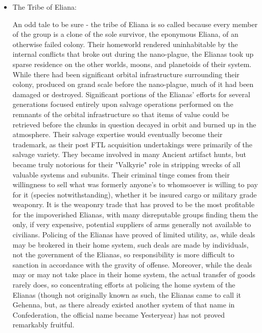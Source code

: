 \begin{itemize}
\item The Tribe of Eliana: 

An odd tale to be sure - the tribe of Eliana is so called because
every member of the group is a clone of the sole survivor, the
eponymous Eliana, of an otherwise failed colony. Their homeworld
rendered uninhabitable by the internal conflicts that broke out during
the nano-plague, the Elianas took up sparse residence on the other
worlds, moons, and planetoids of their system. While there had been
significant orbital infrastructure surrounding their colony, produced
on grand scale before the nano-plague, much of it had been damaged or
destroyed. Significant portions of the Elianas' efforts for several
generations focused entirely upon salvage operations performed on the
remnants of the orbital infrastructure so that items of value could be
retrieved before the chunks in question decayed in orbit and burned up
in the atmosphere. Their salvage expertise would eventually become
their trademark, as their post FTL acquisition undertakings were
primarily of the salvage variety. They became involved in many Ancient
artifact hunts, but became truly notorious for their "Valkyrie" role
in stripping wrecks of all valuable systems and subunits. Their
criminal tinge comes from their willingness to sell what was formerly
anyone's to whomsoever is willing to pay for it (species
notwithstanding), whether it be insured cargo or military grade
weaponry. It is the weaponry trade that has proved to be the most
profitable for the impoverished Elianas, with many disreputable groups
finding them the only, if very expensive, potential suppliers of arms
generally not available to civilians. Policing of the Elianas have
proved of limited utility, as, while deals may be brokered in their
home system, such deals are made by individuals, not the government of
the Elianas, so responsibility is more difficult to sanction in
accordance with the gravity of offense. Moreover, while the deals may
or may not take place in their home system, the actual transfer of
goods rarely does, so concentrating efforts at policing the home
system of the Elianas (though not originally known as such, the
Elianas came to call it Gehenna, but, as there already existed another
system of that name in Confederation, the official name became
Yesteryear) has not proved remarkably fruitful.


\end{itemize}
